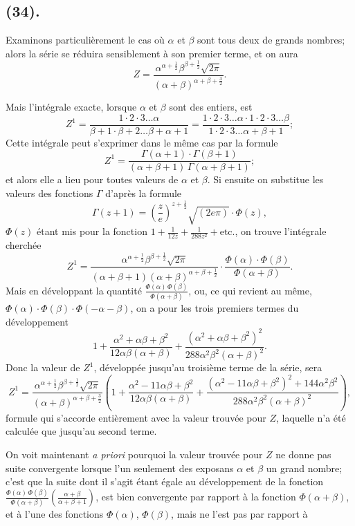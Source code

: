 \documentclass{article}
\begin{document}
\subsection*{(34).}

Examinons particulièrement le cas où $\alpha$ et $\beta$ sont tous deux de grands nombres; alors la série se réduira sensiblement à son premier terme, et on aura
\[ Z=\frac{\alpha^{\alpha+\frac{1}{2}}\beta^{\beta+\frac{1}{2}}\sqrt{2\pi}}{(\alpha+\beta)^{\alpha+\beta+\frac{3}{2}}}. \]

Mais l'intégrale exacte, lorsque $\alpha$ et $\beta$ sont des entiers, est
\[ Z^{1}=\frac{1\cdot2\cdot3\ldots\alpha}{\beta+1\cdot\beta+2\ldots\beta+\alpha+1}=\frac{1\cdot2\cdot3\ldots\alpha\cdot1\cdot2\cdot3\ldots\beta}{1\cdot2\cdot3\ldots\alpha+\beta+1}; \]
Cette intégrale peut s'exprimer dans le même cas par la formule
\[ Z^{1}=\frac{\Gamma(\alpha+1)\cdot\Gamma(\beta+1)}{(\alpha+\beta+1)\,\Gamma(\alpha+\beta+1)}; \]
et alors elle a lieu pour toutes valeurs de $\alpha$ et $\beta$. Si ensuite on substitue les valeurs des fonctions $\Gamma$ d'après la formule
\[ \Gamma(z+1)=\left(\frac{z}{e}\right)^{z+\frac{1}{2}}\sqrt{(2e\pi)}\cdot\Phi(z), \]
$\Phi(z)$ étant mis pour la fonction $1+\frac{1}{12z}+\frac{1}{288z^{2}}+\text{etc.}$, on trouve l'intégrale cherchée
\[ Z^{1}=\frac{\alpha^{\alpha+\frac{1}{2}}\beta^{\beta+\frac{1}{2}}\sqrt{2\pi}}{(\alpha+\beta+1)(\alpha+\beta)^{\alpha+\beta+\frac{1}{2}}}\cdot\frac{\Phi(\alpha)\cdot\Phi(\beta)}{\Phi(\alpha+\beta)}. \]
Mais en développant la quantité $\frac{\Phi(\alpha)\,\Phi(\beta)}{\Phi(\alpha+\beta)}$, ou, ce qui revient au même, $\Phi(\alpha)\cdot\Phi(\beta)\cdot\Phi(-\alpha-\beta)$, on a pour les trois premiers termes du développement
\[ 1+\frac{\alpha^{2}+\alpha\beta+\beta^{2}}{12\alpha\beta(\alpha+\beta)}+\frac{(\alpha^{2}+\alpha\beta+\beta^{2})^{2}}{288\alpha^{2}\beta^{2}(\alpha+\beta)^{2}}. \]
Donc la valeur de $Z^{1}$, développée jusqu'au troisième terme de la série, sera
\[ Z^{1}=\frac{\alpha^{\alpha+\frac{1}{2}}\beta^{\beta+\frac{1}{2}}\sqrt{2\pi}}{(\alpha+\beta)^{\alpha+\beta+\frac{3}{2}}}\left(1+\frac{\alpha^{2}-11\alpha\beta+\beta^{2}}{12\alpha\beta(\alpha+\beta)}+\frac{(\alpha^{2}-11\alpha\beta+\beta^{2})^{2}+144\alpha^{2}\beta^{2}}{288\alpha^{2}\beta^{2}(\alpha+\beta)^{2}}\right), \]
formule qui s'accorde entièrement avec la valeur trouvée pour $Z$, laquelle n'a été calculée que jusqu'au second terme.

On voit maintenant \emph{a priori} pourquoi la valeur trouvée pour $Z$ ne donne pas  suite convergente lorsque l'un seulement des exposans $\alpha$ et $\beta$  un grand nombre; c'est que la suite dont il s'agit étant égale au développement de la fonction $\frac{\Phi(\alpha)\,\Phi(\beta)}{\Phi(\alpha+\beta)}\left(\frac{\alpha+\beta}{\alpha+\beta+1}\right)$, est bien convergente par rapport à la fonction $\Phi(\alpha+\beta)$, et à l'une des fonctions $\Phi(\alpha)$, $\Phi(\beta)$, mais ne l'est pas par rapport à
\end{document}
